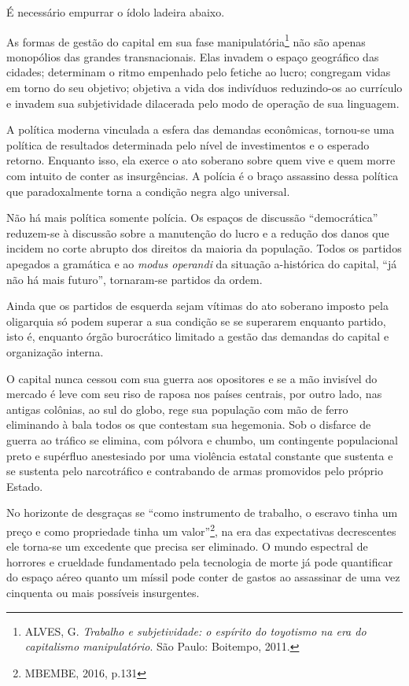 É necessário empurrar o ídolo ladeira abaixo.

As formas de gestão do capital em sua fase manipulatória\footnote{ALVES,
  G. \emph{Trabalho e subjetividade: o espírito do toyotismo na era do
  capitalismo manipulatório}. São Paulo: Boitempo, 2011.} não são apenas
monopólios das grandes transnacionais. Elas invadem o espaço geográfico
das cidades; determinam o ritmo empenhado pelo fetiche ao lucro;
congregam vidas em torno do seu objetivo; objetiva a vida dos indivíduos
reduzindo-os ao currículo e invadem sua subjetividade dilacerada pelo
modo de operação de sua linguagem.

A política moderna vinculada a esfera das demandas econômicas, tornou-se
uma política de resultados determinada pelo nível de investimentos e o
esperado retorno. Enquanto isso, ela exerce o ato soberano sobre quem
vive e quem morre com intuito de conter as insurgências. A polícia é o
braço assassino dessa política que paradoxalmente torna a condição negra
algo universal.

Não há mais política somente polícia. Os espaços de discussão
``democrática'' reduzem-se à discussão sobre a manutenção do lucro e a
redução dos danos que incidem no corte abrupto dos direitos da maioria
da população. Todos os partidos apegados a gramática e ao \emph{modus
operandi} da situação a-histórica do capital, ``já não há mais futuro'',
tornaram-se partidos da ordem.

Ainda que os partidos de esquerda sejam vítimas do ato soberano imposto
pela oligarquia só podem superar a sua condição se se superarem enquanto
partido, isto é, enquanto órgão burocrático limitado a gestão das
demandas do capital e organização interna.

O capital nunca cessou com sua guerra aos opositores e se a mão
invisível do mercado é leve com seu riso de raposa nos países centrais,
por outro lado, nas antigas colônias, ao sul do globo, rege sua
população com mão de ferro eliminando à bala todos os que contestam sua
hegemonia. Sob o disfarce de guerra ao tráfico se elimina, com pólvora e
chumbo, um contingente populacional preto e supérfluo anestesiado por
uma violência estatal constante que sustenta e se sustenta pelo
narcotráfico e contrabando de armas promovidos pelo próprio Estado.

No horizonte de desgraças se ``como instrumento de trabalho, o escravo
tinha um preço e como propriedade tinha um valor''\footnote{MBEMBE,
  2016, p.131}, na era das expectativas decrescentes ele torna-se um
excedente que precisa ser eliminado. O mundo espectral de horrores e
crueldade fundamentado pela tecnologia de morte já pode quantificar do
espaço aéreo quanto um míssil pode conter de gastos ao assassinar de uma
vez cinquenta ou mais possíveis insurgentes.

